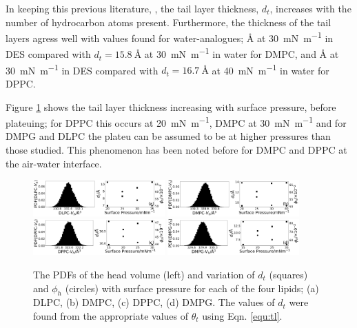 \documentclass[%
 reprint,
 amsmath,amssymb,
 prl,
]{revtex4-1}
\begin{document}
In keeping this previous literature, \cite{Mohwald1990,Vaknin1991}, the tail layer thickness, $d_t$, increases with the number of hydrocarbon atoms present.
Furthermore, the thickness of the tail layers agress well with values found for water-analogues; \si{\angstrom} at \SI{30}{\milli\newton\per\meter} in DES compared with $d_t=\SI{15.8}{\angstrom}$ at \SI{30}{\milli\newton\per\meter}\cite{Johnson1991} in water for DMPC, and \si{\angstrom} at \SI{30}{\milli\newton\per\meter} in DES compared with $d_t=\SI{16.7}{\angstrom}$ at \SI{40}{\milli\newton\per\meter}\cite{Helm1987} in water for DPPC.

Figure \ref{fig:lipresults} shows the tail layer thickness increasing with surface pressure, before plateuing; for DPPC this occurs at \SI{20}{\milli\newton\per\meter}, DMPC at \SI{30}{\milli\newton\per\meter} and for DMPG and DLPC the plateu can be assumed to be at higher pressures than those studied.
This phenomenon has been noted before for DMPC\cite{Bayerl1990} and DPPC\cite{Campbell2018} at the air-water interface.
%
\begin{figure}
	\centering
	\includegraphics[width=0.45\textwidth]{figures/dlpc_vh_dt_phi}
	\includegraphics[width=0.45\textwidth]{figures/dmpc_vh_dt_phi}
	\includegraphics[width=0.45\textwidth]{figures/dppc_vh_dt_phi}
	\includegraphics[width=0.45\textwidth]{figures/dmpg_vh_dt_phi}
	\caption{The PDFs of the head volume (left) and variation of $d_t$ (squares) and $\phi_h$ (circles) with surface pressure for each of the four lipids; (a) DLPC, (b) DMPC, (c) DPPC, (d) DMPG. The values of $d_t$ were found from the appropriate values of $\theta_t$ using Eqn. \ref{equ:tl}.}
	\label{fig:lipresults}
\end{figure}
%
\end{document}
